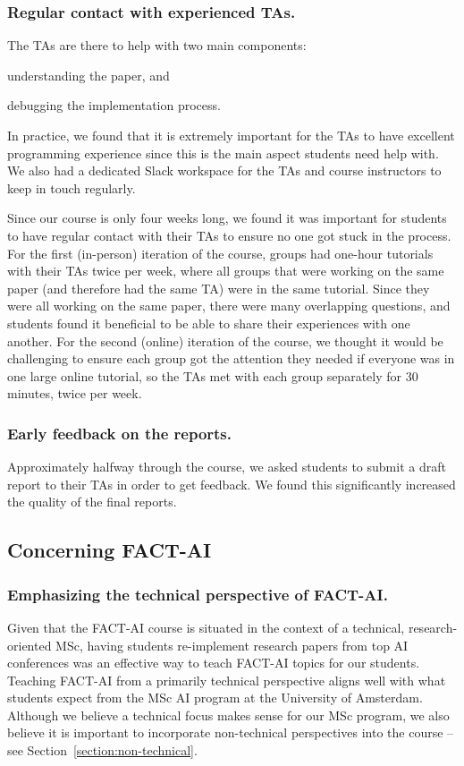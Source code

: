 \documentclass[letterpaper]{article}
\newcommand{\OurUniversity}{the University of Amsterdam}
\begin{document}
\subsubsection{Regular contact with experienced TAs.}
The TAs are there to help with two main components:
\begin{enumerate*}[label=(\roman*)]
\item understanding the paper, and
\item debugging the implementation process.
\end{enumerate*}
In practice, we found that it is extremely important for the TAs to have excellent programming experience since this is the main aspect students need help with.
We also had a dedicated Slack workspace for the TAs and course instructors to keep in touch regularly.

Since our course is only four weeks long, we found it was important for students to have regular contact with their TAs to ensure no one got stuck in the process.
For the first (in-person) iteration of the course, groups had one-hour tutorials with their TAs twice per week, where all groups that were working on the same paper (and therefore had the same TA) were in the same tutorial.
Since they were all working on the same paper, there were many overlapping questions, and students found it beneficial to be able to share their experiences with one another.
For the second (online) iteration of the course, we thought it would be challenging to ensure each group got the attention they needed if everyone was in one large online tutorial, so the TAs met with each group separately for 30 minutes, twice per week.

\subsubsection{Early feedback on the reports.}
Approximately halfway through the course, we asked students to submit a draft report to their TAs in order to get feedback. We found this significantly increased the quality of the final reports.

\subsection{Concerning FACT-AI}

\subsubsection{Emphasizing the technical perspective of FACT-AI.}
Given that the FACT-AI course is situated in the context of a technical, research-oriented MSc, having students re-implement research papers from top AI conferences was an effective way to teach FACT-AI topics for our students.
Teaching FACT-AI from a primarily technical perspective
aligns well with what students expect from the MSc AI program at \OurUniversity{}.
Although we believe a technical focus makes sense for our MSc program, we also believe it is important to incorporate non-technical perspectives into the course -- see Section~\ref{section:non-technical}.
\end{document}

